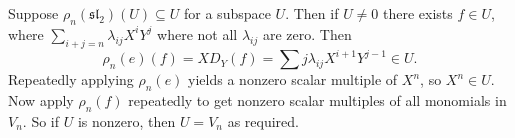Suppose $\rho_n(\mathfrak{sl}_2)(U) \subseteq U$ for a subspace $U$. Then if $U\neq 0$
there exists $f \in U$, where $\sum_{i+j=n}\lambda_{ij}X^iY^j$ where not all
$\lambda_{ij}$ are zero. Then
\[\rho_n(e)(f) = XD_Y(f) = \sum j\lambda_{ij}X^{i+1}Y^{j-1} \in U. \]
Repeatedly applying $\rho_n(e)$ yields a nonzero scalar multiple of $X^n$, so
$X^n \in U$. Now apply $\rho_n(f)$ repeatedly to get nonzero scalar multiples of
all monomials in $V_n$. So if $U$ is nonzero, then $U = V_n$ as required.
